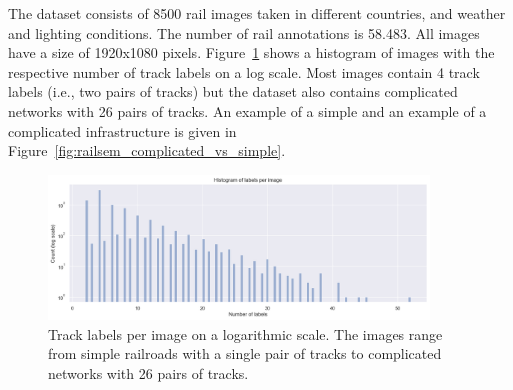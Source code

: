 \documentclass[Master,MDS,english]{BASE/twbook} %
\begin{document}
The dataset consists of 8500 rail images taken in different countries, and weather and lighting conditions. The number of rail annotations is 58.483. All images have a size of 1920x1080 pixels. 
Figure~\ref{fig:labels_per_image_railsem} shows a histogram of images with the respective number of track labels on a log scale. Most images contain 4 track labels (i.e., two pairs of tracks) but the dataset also contains complicated networks with 26 pairs of tracks. An example of a simple and an example of a complicated infrastructure is given in Figure~\ref{fig:railsem_complicated_vs_simple}.



\begin{figure}[H]
\centering
\includegraphics[width=0.9\textwidth]{images/datasets/railsem/labels_per_image}
\caption{Track labels per image on a logarithmic scale. The images range from simple railroads with a single pair of tracks to complicated networks with 26 pairs of tracks. }
\label{fig:labels_per_image_railsem}
\end{figure}
\end{document}
